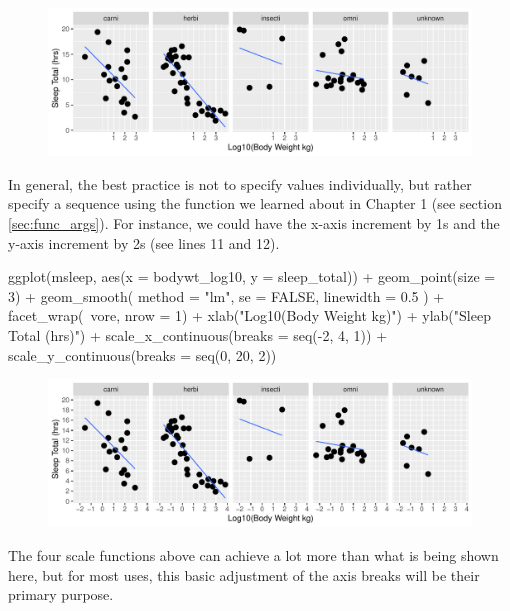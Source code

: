 \vspace{2em}

\begin{figure}[H]
\includegraphics[scale = .75]{graphics/ch2Figs/ggEx_17.pdf}
\end{figure}

In general, the best practice is not to specify values individually, but rather specify a sequence using the  function we learned about in Chapter 1 (see section \ref{sec:func_args}). For instance, we could have the x-axis increment by 1s and the y-axis increment by 2s (see lines 11 and 12).

\begin{inR}
ggplot(msleep, aes(x = bodywt_log10, y = sleep_total)) +
  geom_point(size = 3) +
  geom_smooth(
    method = "lm",
    se = FALSE,
    linewidth = 0.5
  ) +
  facet_wrap(~vore, nrow = 1) +
  xlab("Log10(Body Weight kg)") + 
  ylab("Sleep Total (hrs)") + 
  scale_x_continuous(breaks = seq(-2, 4, 1)) +
  scale_y_continuous(breaks = seq(0, 20, 2))
\end{inR}

\vspace{2em}

\begin{figure}[H]
\includegraphics[scale = .75]{graphics/ch2Figs/ggEx_18.pdf}
\end{figure}

The four scale functions above can achieve a lot more than what is being shown here, but for most uses, this basic adjustment of the axis breaks will be their primary purpose.

